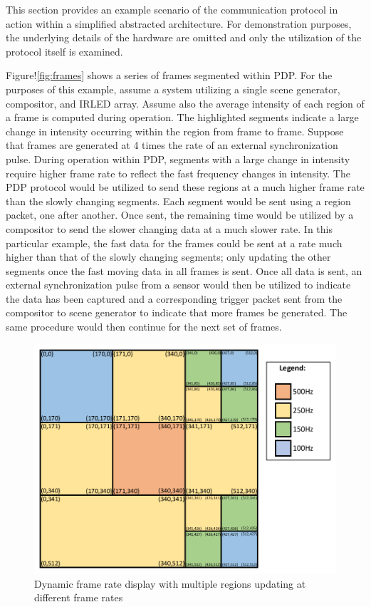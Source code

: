 This section provides an example scenario of the communication protocol in action within a simplified abstracted architecture. For demonstration purposes, the underlying details of the hardware are omitted and only the utilization of the protocol itself is examined.

Figure!\ref{fig:frames} shows a series of frames segmented within PDP. For the purposes of this example, assume a system utilizing a single scene generator, compositor, and IRLED array. Assume also the average intensity of each region of a frame is computed during operation. The highlighted segments indicate a large change in intensity occurring within the region from frame to frame. Suppose that frames are generated at 4 times the rate of an external synchronization pulse. During operation within PDP, segments with a large change in intensity require higher frame rate to reflect the fast frequency changes in intensity. The PDP protocol would be utilized to send these regions at a much higher frame rate than the slowly changing segments. Each segment would be sent using a region packet, one after another. Once sent, the remaining time would be utilized by a compositor to send the slower changing data at a much slower rate. In this particular example, the fast data for the frames could be sent at a rate much higher than that of the slowly changing segments; only updating the other segments once the fast moving data in all frames is sent. Once all data is sent, an external synchronization pulse from a sensor would then be utilized to indicate the data has been captured and a corresponding trigger packet sent from the compositor to scene generator to indicate that more frames be generated. The same procedure would then continue for the next set of frames.

\begin{figure}
    \centering
        \centering
        \includegraphics[width=1.0\textwidth]{fig/variable_display.pdf}
        \caption{Dynamic frame rate display with multiple regions updating at different frame rates}
        \label{fig:variable_display}
\end{figure}

